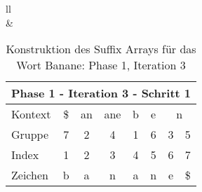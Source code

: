 \begin{table}[H]
\begin{adjustbox}{max width=\textwidth}
\begin{tabular}{ll}
\\
&
\\

\begin{tabular}{lccccccc}
\multicolumn{8}{l}{Phase 1 - Iteration 3 - Schritt 1}                                                                                                                                  \\ \hline
\multicolumn{1}{l|}{Kontext} & \multicolumn{1}{c|}{\$} & \multicolumn{1}{c|}{an} & \multicolumn{1}{c|}{ane} & \multicolumn{1}{c|}{b} & \multicolumn{1}{c|}{e} & \multicolumn{2}{c}{n} \\
\multicolumn{1}{l|}{Gruppe}  & \multicolumn{1}{c|}{7}  & \multicolumn{1}{c|}{2}  & \multicolumn{1}{c|}{4}   & \multicolumn{1}{c|}{1} & \multicolumn{1}{c|}{6} & 3         & 5          \\ \hline
\multicolumn{1}{l|}{Index}   & 1                       & 2                       & 3                        & 4                      & 5                      & 6         & 7          \\
\multicolumn{1}{l|}{Zeichen} & b                       & a                       & n                        & a                      & n                      & e         & \$        
\end{tabular}

\end{tabular}
\end{adjustbox}

\caption[Konstruktion des Suffix Arrays f{\"u}r das Wort Banane: Phase 1, Iteration 3]{Konstruktion des Suffix Arrays f{\"u}r das Wort Banane: Phase 1, Iteration 3}
\label{fig_banane_1_3} 
\end{table}
